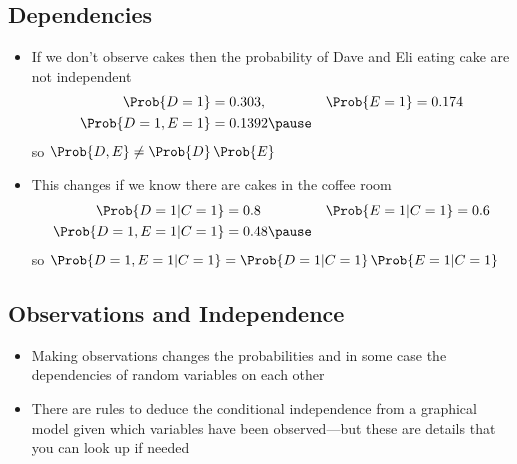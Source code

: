 \begin{slide}
\section[-1]{Dependencies}

\begin{PauseHighLight}
  \begin{itemize}
  \item If we don't observe cakes then the probability of Dave and Eli
    eating cake are not independent
    \begin{align*}
      \Prob{D=1} &= 0.303, & \Prob{E=1} &= 0.174 \\
      \Prob{D=1,E=1} &= 0.1392\pause
    \end{align*}
    so \(\Prob{D,E}\neq\Prob{D}\,\Prob{E}\)\pauseb
  \item This changes if we know there are cakes in the coffee room
    \begin{align*}
      \Prob{D=1|C=1} &= 0.8 & \Prob{E=1|C=1} &= 0.6 \\
      \Prob{D=1,E=1|C=1} &= 0.48\pause
    \end{align*}
    so $\Prob{D=1,E=1|C=1}= \Prob{D=1|C=1}\, \Prob{E=1|C=1}$\pauseb
  \end{itemize}
\end{PauseHighLight}

\end{slide}



\begin{slide}
\section[-2]{Observations and Independence}

\pb
\begin{itemize}
\item Making observations changes the probabilities and in some case the
  dependencies of random variables
  on each other\pauseh
\end{itemize}
\begin{center}
  \pause
\end{center}
\begin{itemize}
\item There are rules to deduce the conditional independence from a
  graphical model given which variables have been observed\pause---but
  these are details that you can look up if needed\pause
\end{itemize}
\end{slide}

